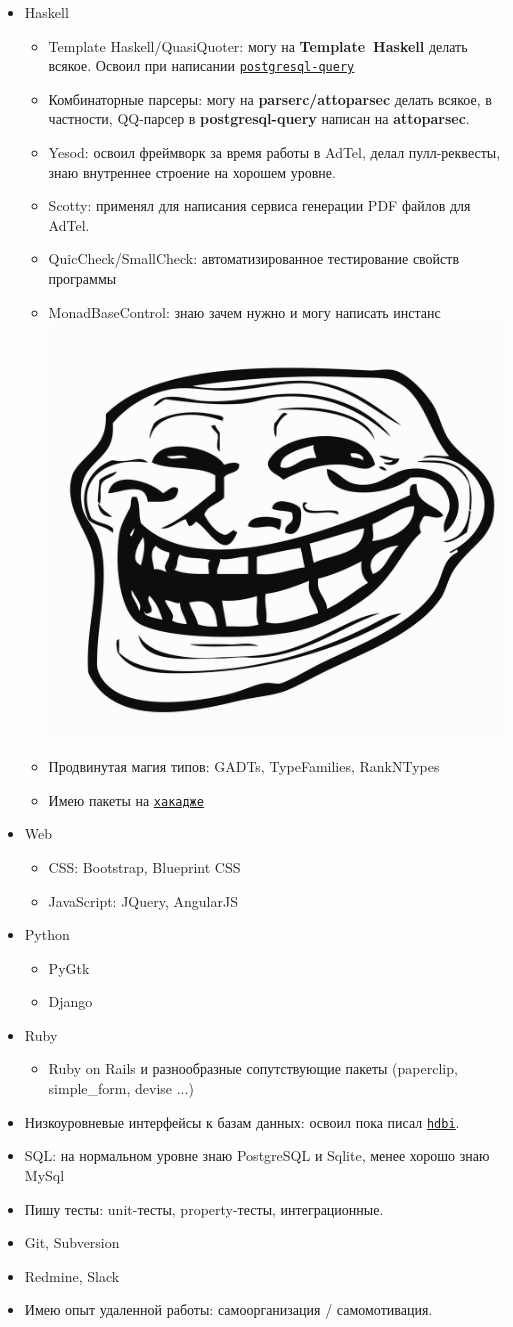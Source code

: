 \documentclass[10pt,a4paper,sans]{moderncv}        %
\newcommand*{\nlink}[2]{\textcolor{blue}{\texttt{\underline{\href{#1}{#2}}}}}
\newcommand*{\bb}[1]{\textbf{\hbox{#1}}}
\begin{document}
\begin{itemize}
\item Haskell
  \begin{itemize}
  \item Template Haskell/QuasiQuoter: могу на \bb{Template Haskell}
    делать всякое. Освоил при написании
    \nlink{http://hackage.haskell.org/package/postgresql-query}{postgresql-query}
  \item Комбинаторные парсеры: могу на \bb{parserc/attoparsec} делать
    всякое, в частности, QQ-парсер в \bb{postgresql-query} написан на
    \bb{attoparsec}.
  \item Yesod: освоил фреймворк за время работы в AdTel, делал
    пулл-реквесты, знаю внутреннее строение на хорошем уровне.
  \item Scotty: применял для написания сервиса генерации PDF файлов для AdTel.
  \item QuicCheck/SmallCheck: автоматизированное тестирование свойств
    программы
  \item MonadBaseControl: знаю зачем нужно и могу написать инстанс \includegraphics[height=1.1ex]{Trollface_HD}
  \item Продвинутая магия типов: GADTs, TypeFamilies, RankNTypes
  \item Имею пакеты на \nlink{http://hackage.haskell.org/user/AlekseyUymanov}{хакадже}
  \end{itemize}
\item Web
  \begin{itemize}
  \item CSS: Bootstrap, Blueprint CSS
  \item JavaScript: JQuery, AngularJS
  \end{itemize}
\item Python
  \begin{itemize}
  \item PyGtk
  \item Django
  \end{itemize}
\item Ruby
  \begin{itemize}
  \item Ruby on Rails и разнообразные сопутствующие пакеты (paperclip, simple\_form, devise ...)
  \end{itemize}
\item Низкоуровневые интерфейсы к базам данных: освоил пока писал
  \nlink{http://hackage.haskell.org/package/hdbi}{hdbi}.
\item SQL: на нормальном уровне знаю PostgreSQL и Sqlite, менее хорошо
  знаю MySql
\item Пишу тесты: unit-тесты, property-тесты, интеграционные.
\item Git, Subversion
\item Redmine, Slack
\item Имею опыт удаленной работы: самоорганизация / самомотивация.
\end{itemize}
\end{document}
